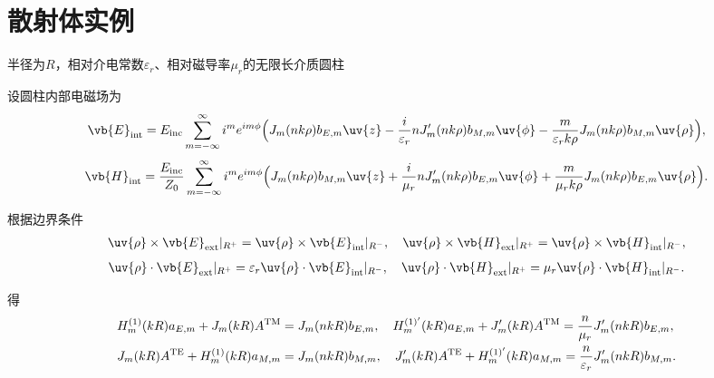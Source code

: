 \section{散射体实例}
\begin{exbox}
	半径为\(R\)，相对介电常数\(\varepsilon_r\)、相对磁导率\(\mu_r\)的无限长介质圆柱

	设圆柱内部电磁场为
	\begin{align*}
		\vb{E}_{\rm int} = E_{\rm inc}\sum\limits_{m = -\infty}^{\infty}i^m e^{im\phi}\Bigl(J_m(nk\rho)b_{E,m}\uv{z} - \frac{i}{\varepsilon_r}nJ_m'(nk\rho)b_{M,m}\uv{\phi} - \frac{m}{\varepsilon_r k\rho}J_m(nk\rho)b_{M,m}\uv{\rho}\Bigr),
	\end{align*}
	\begin{align*}
		\vb{H}_{\rm int} = \frac{E_{\rm inc}}{Z_0}\sum\limits_{m = -\infty}^{\infty}i^m e^{im\phi}\Bigl(J_m(nk\rho)b_{M,m}\uv{z} + \frac{i}{\mu_r}nJ_m'(nk\rho)b_{E,m}\uv{\phi} + \frac{m}{\mu_r k\rho}J_m(nk\rho)b_{E,m}\uv{\rho}\Bigr).
	\end{align*}

	根据边界条件
	\begin{align*}
		\uv{\rho}\times\vb{E}_{\rm ext}|_{R^+} = \uv{\rho}\times\vb{E}_{\rm int}|_{R^-},\quad\uv{\rho}\times\vb{H}_{\rm ext}|_{R^+} = \uv{\rho}\times\vb{H}_{\rm int}|_{R^-},
	\end{align*}
	\begin{align*}
		\uv{\rho}\cdot\vb{E}_{\rm ext}|_{R^+} = \varepsilon_r\uv{\rho}\cdot\vb{E}_{\rm int}|_{R^-},\quad\uv{\rho}\cdot\vb{H}_{\rm ext}|_{R^+} = \mu_r\uv{\rho}\cdot\vb{H}_{\rm int}|_{R^-}.
	\end{align*}

	得
	\begin{align*}
		H_m^{(1)}(kR)a_{E,m} + J_m(kR)A^{\rm TM} &= J_m(nkR)b_{E,m},\quad H_m^{(1)'}(kR)a_{E,m} + J_m'(kR)A^{\rm TM} = \frac{n}{\mu_r}J_m'(nkR)b_{E,m}
		,\\
		J_m(kR)A^{\rm TE} + H_m^{(1)}(kR)a_{M,m} &= J_m(nkR)b_{M,m},\quad
		J_m'(kR)A^{\rm TE} + H_m^{(1)'}(kR)a_{M,m} = \frac{n}{\varepsilon_r}J_m'(nkR)b_{M,m}.
	\end{align*}


\end{exbox}
